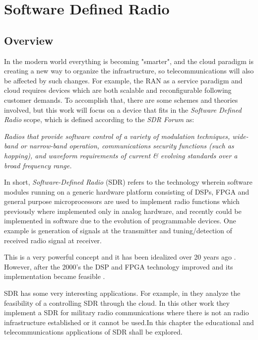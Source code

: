 \chapter{Software Defined Radio}
\label{chap:sdr}

\section{Overview}%
\label{sdr:overview}

In the modern world everything is becoming "smarter", and the cloud paradigm is
creating a new way to organize the infrastructure, so telecommunications will
also be affected by such changes. For example, the RAN as a service  paradigm
and cloud requires devices which are both scalable and reconfigurable following
customer demands. To accomplish that, there are some schemes and theories
involved, but this work will focus on a device that fits in the \emph{Software
Defined Radio} scope, which is defined according to the \emph{SDR Forum}
\cite{web:sdrforum} as:\\

\begin{displayquote}
\textit{Radios that provide software control of a variety of modulation techniques,
wide-band or narrow-band operation, communications security functions (such as
hopping), and waveform requirements of current \& evolving standards over a
broad frequency range.}\\
\end{displayquote}

In short, \textit{Software-Defined Radio} (SDR) refers to the technology wherein
software modules running on a generic hardware platform consisting of DSPs, FPGA
and general purpose microprocessors are used to implement radio functions which
previously where implemented only in analog hardware, and recently could be
implemented in software due to the evolution of programmable devices. One
example is generation of signals at the transmitter and tuning/detection of
received radio signal at receiver.

This is a very powerful concept and it has been idealized over 20 years ago
\cite{ladimer2009}. However, after the 2000's the DSP and FPGA technology
improved and its implementation became feasible \cite{ladimer2009}.

SDR has some very interesting applications. For example, in \cite{dayananda2012}
they analyze the feasibility of a controlling SDR through the cloud. In this
other work \cite{chamberlain2005} they implement a SDR for military radio
communications where there is not an radio infrastructure established or it
cannot be used.In this chapter the educational and telecommunications
applications of SDR shall be explored.

